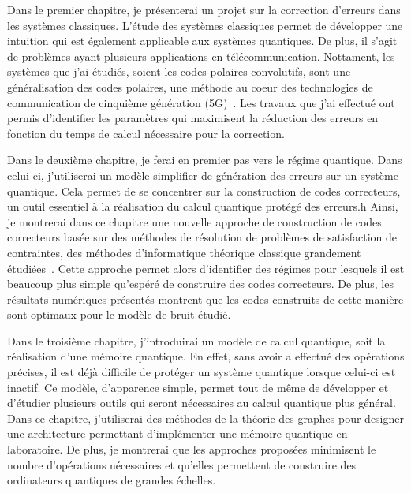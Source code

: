 Dans le premier chapitre,
je présenterai un projet sur la correction d'erreurs dans les systèmes classiques.
L'étude des systèmes classiques permet de développer une intuition qui est également
applicable aux systèmes quantiques.
De plus, il s'agit de problèmes ayant plusieurs applications en télécommunication.
Nottament,
les systèmes que j'ai étudiés,
soient les codes polaires convolutifs,
sont une généralisation des codes polaires,
une méthode au coeur des technologies de communication de cinquième génération (5G)~\cite{arikan_rate_2009, bioglio_design_2021}.
Les travaux que j'ai effectué ont permis d'identifier les paramètres qui maximisent la réduction des erreurs
en fonction du temps de calcul nécessaire pour la correction.

Dans le deuxième chapitre,
je ferai en premier pas vers le régime quantique.
Dans celui-ci,
j'utiliserai un modèle simplifier de génération des erreurs sur un système quantique.
Cela permet de se concentrer sur la construction de codes correcteurs,
un outil essentiel à la réalisation du calcul quantique protégé des erreurs.h
Ainsi,
je montrerai dans ce chapitre une nouvelle approche de construction de codes correcteurs
basée sur des méthodes de résolution de problèmes de satisfaction de contraintes,
des méthodes d'informatique théorique classique grandement étudiées~\cite{arora_computational_2009, noauthor_minizinc_nodate, noauthor_sat_nodate, achlioptas_rigorous_2005}.
Cette approche permet alors d'identifier des régimes pour lesquels il est beaucoup plus simple qu'espéré
de construire des codes correcteurs.
De plus,
les résultats numériques présentés montrent que les codes construits de cette manière
sont optimaux pour le modèle de bruit étudié.

Dans le troisième chapitre,
j'introduirai un modèle de calcul quantique,
soit la réalisation d'une mémoire quantique.
En effet,
sans avoir a effectué des opérations précises,
il est déjà difficile de protéger un système quantique lorsque celui-ci est inactif.
Ce modèle,
d'apparence simple,
permet tout de même de développer et d'étudier plusieurs outils qui seront nécessaires
au calcul quantique plus général.
Dans ce chapitre,
j'utiliserai des méthodes de la théorie des graphes pour designer une architecture 
permettant d'implémenter une mémoire quantique en laboratoire.
De plus,
je montrerai que les approches proposées minimisent le nombre d'opérations nécessaires
et qu'elles permettent de construire des ordinateurs quantiques de grandes échelles.
